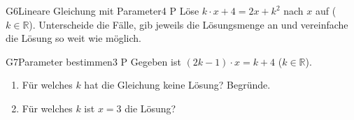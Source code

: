 \documentclass[11pt]{article}
\begin{document}

\begin{lpaufgabe}{G6}{Lineare Gleichung mit Parameter}{4 P}
Löse $k \cdot x + 4 = 2x + k^2$ nach $x$ auf ($k \in \mathbb{R}$). Unterscheide die Fälle, gib jeweils die Lösungsmenge an und vereinfache die Lösung so weit wie möglich.
\end{lpaufgabe}

\begin{lpaufgabe}{G7}{Parameter bestimmen}{3 P}
Gegeben ist $(2k - 1) \cdot x = k + 4$ ($k \in \mathbb{R}$).
\begin{enumerate}[label=(\alph*),leftmargin=*,itemsep=1pt]
\item Für welches $k$ hat die Gleichung keine Lösung? Begründe.
\item Für welches $k$ ist $x = 3$ die Lösung?
\end{enumerate}
\end{lpaufgabe}
\end{document}
